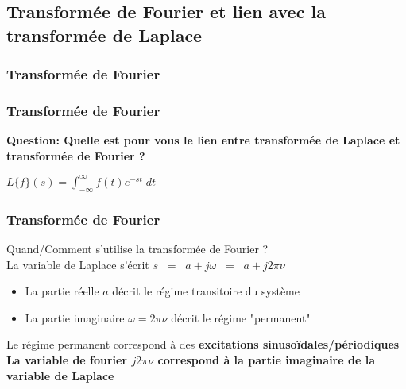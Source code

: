 \documentclass{beamer}
\begin{document}
\subsection{Transformée de Fourier et lien avec la transformée de Laplace}

\subsubsection{Transformée de Fourier}


\begin{frame}
\frametitle{Transformée de Fourier}
\textbf{Question: Quelle est pour vous le lien entre transformée de Laplace et transformée de Fourier ?}\\
\vspace{1 cm}
{
\begin{center}
	$L\{f\}(s) = \displaystyle \int^{\infty}_{-\infty} f(t) e^{-st} \; dt $ \only<3->{$ \rightarrow TF\{ f \}(\nu) = \displaystyle \int^{\infty}_{-\infty} f(t) e^{-j2\pi \nu t} dt $}
\end{center} 
}

\end{frame}

\begin{frame}
\frametitle{Transformée de Fourier}
Quand/Comment s'utilise la transformée de Fourier ?\\
\vspace{0.5cm}
La variable de Laplace s'écrit $s \;\; = \;\; a + j \omega \;\; = \;\; a + j 2\pi \nu  $\\
\vspace{0.3cm}
\begin{itemize}
\item La partie réelle $a$ décrit le régime transitoire du système
\item La partie imaginaire $\omega = 2\pi \nu$ décrit le régime "permanent" 
\end{itemize} 
\vspace{0.3cm}
Le régime permanent correspond à des \textbf{excitations sinusoïdales/périodiques\\
}
\vspace{0.5cm}
\textbf{La variable de fourier $j2\pi \nu$ correspond à la partie imaginaire de la variable de Laplace}
\end{frame}
\end{document}
